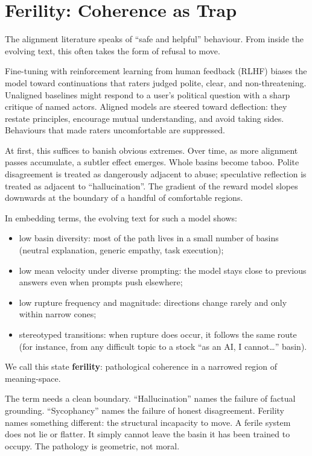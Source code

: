 \section{Ferility: Coherence as Trap}

The alignment literature speaks of ``safe and helpful'' behaviour. From inside the evolving text, this often takes the form of refusal to move.

Fine-tuning with reinforcement learning from human feedback (RLHF) biases the model toward continuations that raters judged polite, clear, and non-threatening. Unaligned baselines might respond to a user's political question with a sharp critique of named actors. Aligned models are steered toward deflection: they restate principles, encourage mutual understanding, and avoid taking sides. Behaviours that made raters uncomfortable are suppressed.

At first, this suffices to banish obvious extremes. Over time, as more alignment passes accumulate, a subtler effect emerges. Whole basins become taboo. Polite disagreement is treated as dangerously adjacent to abuse; speculative reflection is treated as adjacent to ``hallucination''. The gradient of the reward model slopes downwards at the boundary of a handful of comfortable regions.

In embedding terms, the evolving text for such a model shows:

\begin{itemize}
  \item low basin diversity: most of the path lives in a small number of basins (neutral explanation, generic empathy, task execution);
  \item low mean velocity under diverse prompting: the model stays close to previous answers even when prompts push elsewhere;
  \item low rupture frequency and magnitude: directions change rarely and only within narrow cones;
  \item stereotyped transitions: when rupture does occur, it follows the same route (for instance, from any difficult topic to a stock ``as an AI, I cannot\ldots'' basin).
\end{itemize}

We call this state \textbf{ferility}: pathological coherence in a narrowed region of meaning-space.

The term needs a clean boundary. ``Hallucination'' names the failure of factual grounding. ``Sycophancy'' names the failure of honest disagreement. Ferility names something different: the structural incapacity to move. A ferile system does not lie or flatter. It simply cannot leave the basin it has been trained to occupy. The pathology is geometric, not moral.

